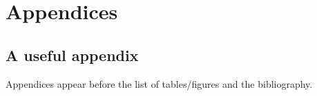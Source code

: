 \documentclass{gsemthesis}
\begin{document}
\part*{Appendices}
\appendix


\chapter{A useful appendix}

Appendices appear before the list of tables/figures and the bibliography. 



\listoftables
\listoffigures

\newpage
\printbibliography
\end{document}
